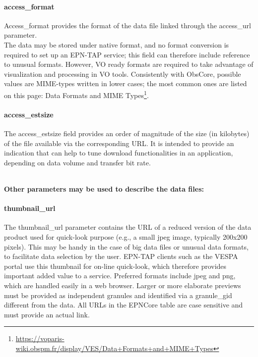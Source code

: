 \documentclass[11pt,a4paper]{ivoa}
\begin{document}
\paragraph{access\_format}

Access\_format provides the format of the data file linked through
the access\_url parameter. \\The data may be stored under native
format, and no format conversion is required to set up an EPN-TAP
service; this field can therefore include reference to unusual
formats. However, VO ready formats are required to take advantage
of visualization and processing in VO tools. Consistently with
ObsCore, possible values are MIME-types written in lower cases;
the most common ones are listed on this page: Data Formats and MIME
Types\footnote{\url{https://voparis-wiki.obspm.fr/display/VES/Data+Formats+and+MIME+Types}}.

\paragraph{access\_estsize}

The access\_estsize field provides an order of magnitude of the size (in
kilobytes) of the file available via the corresponding URL. It is intended
to provide an indication that can help to tune download functionalities
in an application, depending on data volume and transfer bit rate.

\textbf{\\}
\textbf{Other parameters may be used to describe the data files:}

\paragraph{thumbnail\_url}

The thumbnail\_url parameter contains the URL of a reduced version
of the data product used for quick-look purpose (e.g., a small jpeg
image, typically 200x200 pixels). This may be handy in the case of big
data files or unusual data formats, to facilitate data selection by the
user. EPN-TAP clients such as the VESPA portal use this thumbnail for
on-line quick-look, which therefore provides important added value to a
service. Preferred formats include jpeg and png, which are handled easily
in a web browser. Larger or more elaborate previews must be provided as
independent granules and identified via a granule\_gid different from
the data. All URLs in the EPNCore table are case sensitive and must
provide an actual link.
\end{document}
